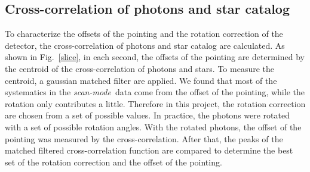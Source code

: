 \documentclass[12pt, preprint]{aastex}
\newcommand{\project}[1]{\textsl{#1}}
\newcommand{\scanmode}{\project{scan-mode}}
\begin{document}
\subsection{Cross-correlation of photons and star catalog}
To characterize the offsets of the pointing and the rotation correction of the detector, the cross-correlation of photons and star catalog are calculated. 
As shown in Fig.~\ref{slice}, in each second, the offsets of the pointing are determined by the centroid of the cross-correlation of photons and stars. 
To measure the centroid, a gaussian matched filter are applied.
We found that most of the systematics in the \scanmode\ data come from the offset of the pointing, while the rotation only contributes a little.
Therefore in this project, the rotation correction are chosen from a set of possible values. 
In practice, the photons were rotated with a set of possible rotation angles. With the rotated photons, the offset of the pointing was measured by the cross-correlation. After that, the peaks of the matched filtered cross-correlation function are compared to determine the best set of the rotation correction and the offset of the pointing.
\end{document}

